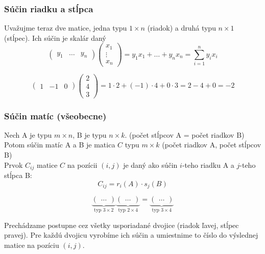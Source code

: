 \subsubsection{Súčin riadku a stĺpca}
Uvažujme teraz dve matice, jedna typu $1 \times n$ (riadok) a druhá typu $n \times 1$ (stĺpec). Ich súčin je skalár daný
\[ \begin{pmatrix} y_1 & \dots & y_n \end{pmatrix} \begin{pmatrix} x_1 \\ \vdots \\ x_n \end{pmatrix} = y_1 x_1 + \dots + y_n x_n = \sum_{i=1}^n y_i x_i \]
\begin{example}
\[ \begin{pmatrix} 1 & -1 & 0 \end{pmatrix} \begin{pmatrix} 2 \\ 4 \\ 3 \end{pmatrix} = 1 \cdot 2 + (-1) \cdot 4 + 0 \cdot 3 = 2 - 4 + 0 = -2 \]
\end{example}

\subsubsection{Súčin matíc (všeobecne)}
Nech A je typu $m \times n$, B je typu $n \times k$. (počet stĺpcov A = počet riadkov B) \\
Potom súčin matíc A a B je matica $C$ typu $m \times k$ (počet riadkov A, počet stĺpcov B) \\
Prvok $C_{ij}$ matice $C$ na pozícii $(i, j)$ je daný ako súčin $i$-teho riadku A a $j$-teho stĺpca B:
\[ C_{ij} = r_i(A) \cdot s_j(B) \]

\begin{example}
\[ \underbrace{\begin{pmatrix} \dots \end{pmatrix}}_{\text{typ } 3 \times 2} \underbrace{\begin{pmatrix} \dots \end{pmatrix}}_{\text{typ } 2 \times 4} = \underbrace{\begin{pmatrix} \dots \end{pmatrix}}_{\text{typ } 3 \times 4} \]
\end{example}
Prechádzame postupne cez všetky usporiadané dvojice (riadok ľavej, stĺpec pravej). Pre každú dvojicu vyrobíme ich súčin a umiestnime to číslo do výslednej matice na pozíciu $(i, j)$.

